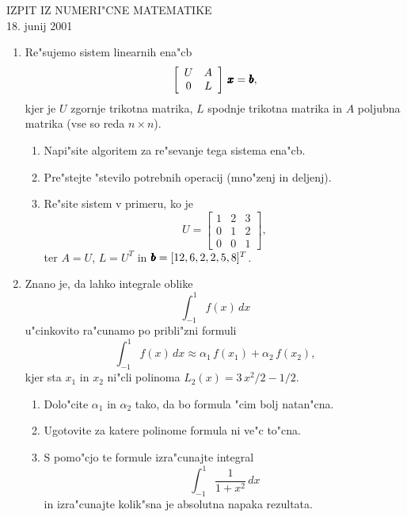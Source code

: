 \documentclass[12pt,a4paper]{article}
\def\bfm#1{{\dimen0=.01em\dimen1=.009em\makebold{$#1$}}}
\def\makebold#1{\mathord{\setbox0=\hbox{#1}%
       \copy0\kern-\wd0%
       \raise\dimen1\copy0\kern-\wd0%
       {\advance\dimen1 by \dimen1\raise\dimen1\copy0}\kern-\wd0%
       \kern\dimen0\raise\dimen1\copy0\kern-\wd0%
       {\advance\dimen1 by \dimen1\raise\dimen1\copy0}\kern-\wd0%
       \kern\dimen0\raise\dimen1\copy0\kern-\wd0%
       {\advance\dimen1 by \dimen1\raise\dimen1\copy0}\kern-\wd0%
       \kern\dimen0\raise\dimen1\copy0\kern-\wd0%
       \kern\dimen0\box0}}
\begin{document}
\begin{center}
  IZPIT IZ NUMERI"CNE MATEMATIKE\\
  18. junij 2001
\end{center}

\begin{enumerate}

  \item Re"sujemo sistem linearnih ena"cb
    $$\left[
    \begin{array}{cc}
      U & A\\
      0 & L
    \end{array}
    \right]\,\bfm{x}=\bfm{b},$$
    kjer je $U$ zgornje trikotna matrika, $L$ spodnje trikotna matrika in
    $A$ poljubna matrika (vse so reda $n\times n$).


  \begin{enumerate}
   
     \item Napi"site algoritem za re"sevanje tega sistema ena"cb.
       

     \item Pre"stejte "stevilo potrebnih operacij (mno"zenj in deljenj).
       
       

     \item Re"site sistem v primeru, ko je
         $$U=
         \left[
         \begin{array}{ccc}
            1 & 2 & 3\\
            0 & 1 & 2\\
            0 & 0 & 1
         \end{array}
         \right],
         $$
         ter $A=U$, $L=U^T$ in $\bfm{b}=[12,6,2,2,5,8]^T$.       
       
  \end{enumerate}

  \item Znano je, da lahko integrale oblike
    $$\int_{-1}^{1}f(x)\,dx$$
    u"cinkovito ra"cunamo po pribli"zni formuli
    $$\int_{-1}^{1}f(x)\,dx\approx \alpha_1\,f(x_1)+\alpha_2\,f(x_2),$$
    kjer sta $x_1$ in $x_2$ ni"cli polinoma $L_2(x)=3\,x^2/2-1/2$.
    

  \begin{enumerate}
    
    \item Dolo"cite $\alpha_1$ in $\alpha_2$ tako, da bo formula "cim bolj
          natan"cna.

    \item Ugotovite za katere polinome formula ni ve"c to"cna.
      
    \item S pomo"cjo te formule izra"cunajte integral
          $$\int_{-1}^{1}\frac{1}{1+x^2}\,dx$$
          in izra"cunajte kolik"sna je absolutna napaka rezultata.
      
          

  \end{enumerate} 
\end{enumerate}
\end{document}
